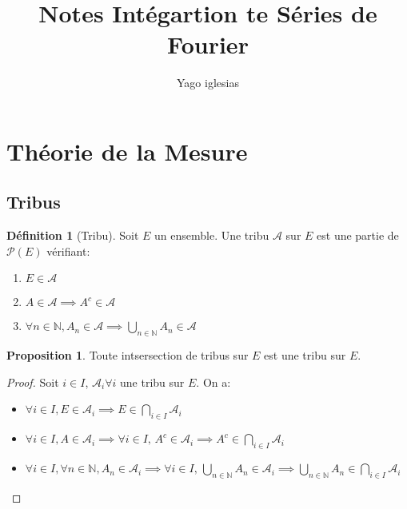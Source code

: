 \documentclass{article}
\theoremstyle{definition}
\newtheorem{definition}{Définition}
\theoremstyle{definition}
\newtheorem{prop}{Proposition}
\theoremstyle{definition}
\theoremstyle{definition}
\theoremstyle{plain}
\theoremstyle{definition}
\begin{document}
\title{Notes Intégartion te Séries de Fourier}
\author{Yago iglesias}
\maketitle
\tableofcontents

\section{Théorie de la Mesure}

\subsection{Tribus}


\begin{definition}[Tribu]
	Soit $E$ un ensemble. Une tribu $\mathscr{A}$ sur $E$ est une partie de $\mathscr{P}(E)$ vérifiant:
	\begin{enumerate}
		\item $E \in \mathscr{A}$
		\item $A \in \mathscr{A} \implies A^c \in \mathscr{A}$
		\item $ \forall n \in \mathbb{N}, A_n \in \mathscr{A} \implies \bigcup\limits_{n \in \mathbb{N}} A_n \in \mathscr{A}$
	\end{enumerate}
\end{definition}


\begin{prop}
	Toute intsersection de tribus sur $E$ est une tribu sur $E$.
\end{prop}

\begin{proof}
	Soit $i \in I$, $\mathscr{A}_i \forall i$ une tribu sur $E$. On a:
	\begin{itemize}
		\item $\forall  i \in I, E \in \mathscr{A}_i \implies E \in \bigcap\limits_{i \in I} \mathscr{A}_i$
		\item $\forall i \in I, A \in \mathscr{A}_i \implies \forall i \in I, \, A^c \in \mathscr{A}_i
			      \implies A^c \in \bigcap\limits_{i \in I} \mathscr{A}_i$
		\item $\forall i \in I, \forall n \in \mathbb{N}, A_n \in \mathscr{A}_i \implies
			      \forall i \in I, \,\bigcup\limits_{n \in \mathbb{N}} A_n \in \mathscr{A}_i \implies
			      \bigcup\limits_{n \in \mathbb{N}} A_n \in \bigcap\limits_{i \in I} \mathscr{A}_i$
	\end{itemize}
\end{proof}
\end{document}
